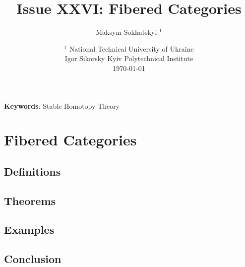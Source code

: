 \documentclass{article}
\begin{document}
\title{Issue XXVI: Fibered Categories}
\author{Maksym Sokhatskyi $^1$}
\date{ $^1$ National Technical University of Ukraine \\
       \small Igor Sikorsky Kyiv Polytechnical Institute \\
       \today }

\maketitle

\begin{abstract}
\end{abstract}

{\bf Keywords}: Stable Homotopy Theory

\ifincludeTOC
  \tableofcontents
\fi

\section{Fibered Categories}


\subsection{Definitions}
\subsection{Theorems}
\subsection{Examples}
\subsection{Conclusion}
\end{document}
